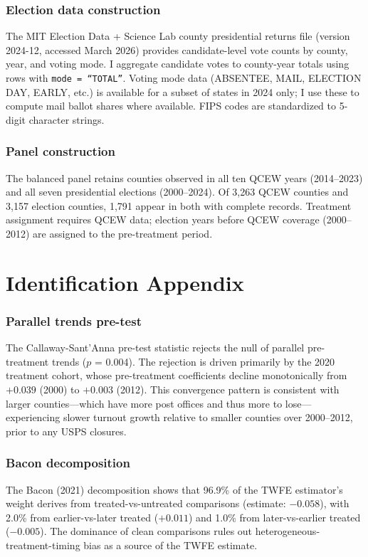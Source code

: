 \documentclass[12pt]{article}
\begin{document}
\subsubsection*{Election data construction} The MIT Election Data + Science Lab county presidential returns file (version 2024-12, accessed March 2026) provides candidate-level vote counts by county, year, and voting mode. I aggregate candidate votes to county-year totals using rows with \texttt{mode = ``TOTAL''}. Voting mode data (ABSENTEE, MAIL, ELECTION DAY, EARLY, etc.) is available for a subset of states in 2024 only; I use these to compute mail ballot shares where available. FIPS codes are standardized to 5-digit character strings.

\subsubsection*{Panel construction} The balanced panel retains counties observed in all ten QCEW years (2014--2023) and all seven presidential elections (2000--2024). Of 3,263 QCEW counties and 3,157 election counties, 1,791 appear in both with complete records. Treatment assignment requires QCEW data; election years before QCEW coverage (2000--2012) are assigned to the pre-treatment period.


\section{Identification Appendix}

\subsubsection*{Parallel trends pre-test} The Callaway-Sant'Anna pre-test statistic rejects the null of parallel pre-treatment trends ($p$ = 0.004). The rejection is driven primarily by the 2020 treatment cohort, whose pre-treatment coefficients decline monotonically from $+0.039$ (2000) to $+0.003$ (2012). This convergence pattern is consistent with larger counties---which have more post offices and thus more to lose---experiencing slower turnout growth relative to smaller counties over 2000--2012, prior to any USPS closures.

\subsubsection*{Bacon decomposition} The Bacon (2021) decomposition shows that 96.9\% of the TWFE estimator's weight derives from treated-vs-untreated comparisons (estimate: $-0.058$), with 2.0\% from earlier-vs-later treated ($+0.011$) and 1.0\% from later-vs-earlier treated ($-0.005$). The dominance of clean comparisons rules out heterogeneous-treatment-timing bias as a source of the TWFE estimate.
\end{document}
